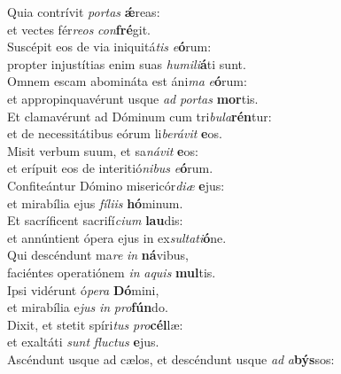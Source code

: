 \evenverse Quia contrívit \textit{por}\textit{tas} \textbf{ǽ}reas:~\*\\
\evenverse et vectes fér\textit{re}\textit{os} \textit{con}\textbf{fré}git.\\
\oddverse Suscépit eos de via iniquitá\textit{tis} \textit{e}\textbf{ó}rum:~\*\\
\oddverse propter injustítias enim suas \textit{hu}\textit{mi}\textit{li}\textbf{á}ti sunt.\\
\evenverse Omnem escam abomináta est áni\textit{ma} \textit{e}\textbf{ó}rum:~\*\\
\evenverse et appropinquavérunt usque \textit{ad} \textit{por}\textit{tas} \textbf{mor}tis.\\
\oddverse Et clamavérunt ad Dóminum cum tri\textit{bu}\textit{la}\textbf{rén}tur:~\*\\
\oddverse et de necessitátibus eórum li\textit{be}\textit{rá}\textit{vit} \textbf{e}os.\\
\evenverse Misit verbum suum, et sa\textit{ná}\textit{vit} \textbf{e}os:~\*\\
\evenverse et erípuit eos de interitió\textit{ni}\textit{bus} \textit{e}\textbf{ó}rum.\\
\oddverse Confiteántur Dómino misericór\textit{di}\textit{æ} \textbf{e}jus:~\*\\
\oddverse et mirabília ejus \textit{fí}\textit{li}\textit{is} \textbf{hó}minum.\\
\evenverse Et sacríficent sacrifí\textit{ci}\textit{um} \textbf{lau}dis:~\*\\
\evenverse et annúntient ópera ejus in ex\textit{sul}\textit{ta}\textit{ti}\textbf{ó}ne.\\
\oddverse Qui descéndunt ma\textit{re} \textit{in} \textbf{ná}vibus,~\*\\
\oddverse faciéntes operatiónem \textit{in} \textit{a}\textit{quis} \textbf{mul}tis.\\
\evenverse Ipsi vidérunt ó\textit{pe}\textit{ra} \textbf{Dó}mini,~\*\\
\evenverse et mirabília e\textit{jus} \textit{in} \textit{pro}\textbf{fún}do.\\
\oddverse Dixit, et stetit spíri\textit{tus} \textit{pro}\textbf{cél}læ:~\*\\
\oddverse et exaltáti \textit{sunt} \textit{flu}\textit{ctus} \textbf{e}jus.\\
\evenverse Ascéndunt usque ad cælos, et descéndunt usque \textit{ad} \textit{a}\textbf{býs}sos:~\*\\
